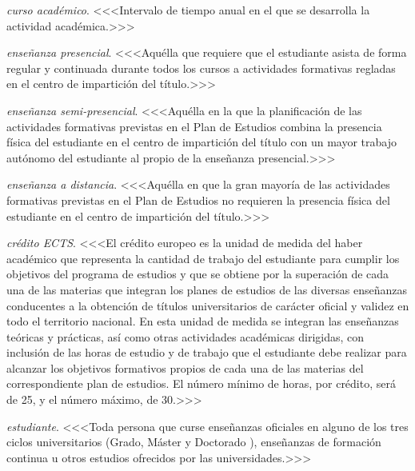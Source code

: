     \item \emph{curso académico}. <<<Intervalo de tiempo anual en el que se desarrolla la actividad académica.>>>

    \item \emph{enseñanza presencial}. <<<Aquélla que requiere que el estudiante
        asista de forma regular y continuada durante todos los cursos a
        actividades formativas regladas en el centro de impartición del título\cite[página 10]{guiaMadridMasD}.>>>

    \item \emph{enseñanza semi-presencial}. <<<Aquélla en la que la planificación de las
        actividades formativas previstas en el Plan de Estudios combina la
        presencia física del estudiante en el centro de impartición del título con un
        mayor trabajo autónomo del estudiante al propio de la enseñanza
        presencial\cite[página 10]{guiaMadridMasD}.>>>

    \item \emph{enseñanza a distancia}. <<<Aquélla en que la gran mayoría de las actividades
        formativas previstas en el Plan de Estudios no requieren la presencia física
        del estudiante en el centro de impartición del título\cite[página 10]{guiaMadridMasD}.>>>

    \item \emph{crédito ECTS}. <<<El crédito europeo es la unidad de medida del
        haber académico que representa la cantidad de trabajo del estudiante
        para cumplir los objetivos del programa de estudios y que se obtiene
        por la superación de cada una de las materias que integran los planes
        de estudios de las diversas enseñanzas conducentes a la obtención de
        títulos universitarios de carácter oficial y validez en todo el
        territorio nacional. En esta unidad de medida se integran las
        enseñanzas teóricas y prácticas, así como otras actividades académicas
        dirigidas, con inclusión de las horas de estudio y de trabajo que el
        estudiante debe realizar para alcanzar los objetivos formativos propios
        de cada una de las materias del correspondiente plan de
        estudios\cite[artículo 3]{rdECTS}. El número mínimo de horas, por
        crédito, será de 25, y el número máximo, de 30\cite[artículo 4, apartado 
        5]{rdECTS}.>>>

    \item \emph{estudiante}. <<<Toda  persona  que  curse  enseñanzas  oficiales
        en alguno de los tres ciclos universitarios (Grado, Máster y Doctorado
        \cite[artículo 8]{rd1393}), enseñanzas de formación continua u otros
        estudios ofrecidos por las universidades\cite[artículo
        1, apartado 3]{estatutoEstudiante}.>>>

